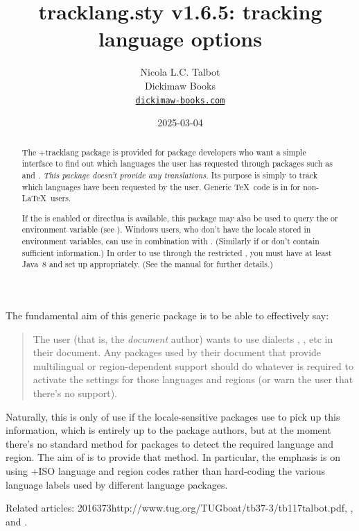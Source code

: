 \documentclass[titlepage=false,oneside,
 fontsize=12pt,captions=tableheading]{scrbook}
\title{tracklang.sty v1.6.5: 
tracking language options}
\author{Nicola L.C. Talbot\\[10pt]
Dickimaw Books\\
\href{https://www.dickimaw-books.com/}{\nolinkurl{dickimaw-books.com}}}
\date{2025-03-04
}
\begin{document}
\maketitle

\htmlavailable

\begin{abstract}
The \sty+{tracklang} package is provided for package developers
who want a simple interface to find out which languages the user has
requested through packages such as  and
. \emph{This package doesn't provide any
translations.}
Its purpose is simply to track which languages have been requested by the
user. Generic \TeX\ code is in  for
non-\LaTeX\ users.

If the  is enabled or \gls{directlua} is available,
this package may also be used to query the 
or  environment variable (see
). Windows users, who don't have the locale
stored in environment variables, can use 
in combination with . (Similarly if 
or  don't contain sufficient information.) In order to
use  through the restricted , you must
have at least Java~8 and set up 
appropriately. (See the  manual for further details.)
\end{abstract}

The fundamental aim of this generic package is to be able to
effectively say:
\begin{quote}
The user (that is, the \emph{document} author) wants to use
dialects , , etc in their
document. Any packages used by their document that provide 
multilingual or region-dependent support should do whatever is
required to activate the settings for those languages and regions
(or warn the user that there's no support).
\end{quote}
Naturally, this is only of use if the locale-sensitive packages use
 to pick up this information, which is entirely up
to the package authors, but at the moment there's no standard method
for packages to detect the required language and region. The aim of
 is to provide that method. In particular, the
emphasis is on using \idx+{ISO} language and region codes rather than
hard-coding the various language labels used by different language
packages.

Related articles: 
{2016}{37}{3}{http://www.tug.org/TUGboat/tb37-3/tb117talbot.pdf},
,
and .
\end{document}
